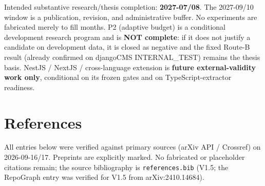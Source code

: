 \documentclass[11pt,a4paper]{article}
\begin{document}
Intended substantive research/thesis completion: \textbf{2027-07/08}. The
2027-09/10 window is a publication, revision, and administrative buffer. No
experiments are fabricated merely to fill months. P2 (adaptive budget) is a
conditional development research program and is \textbf{NOT complete}: if it
does not justify a candidate on development data, it is closed as negative and
the fixed Route-B result (already confirmed on djangoCMS INTERNAL\_TEST)
remains the thesis basis. NestJS / NextJS / cross-language extension is
\textbf{future external-validity work only}, conditional on its frozen gates
and on TypeScript-extractor readiness.

\section{References}
\label{sec:refs}

All entries below were verified against primary sources (arXiv API /
Crossref) on 2026-09-16/17. Preprints are explicitly marked. No fabricated or
placeholder citations remain; the source bibliography is
\texttt{references.bib} (V1.5; the RepoGraph entry was verified for V1.5 from
arXiv:2410.14684).



\end{document}

